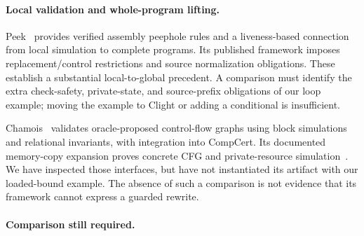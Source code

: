 \paragraph{Local validation and whole-program lifting.}
Peek~\cite{peek2016} provides verified assembly peephole rules and a
liveness-based connection from local simulation to complete programs. Its
published framework imposes replacement/control restrictions and source
normalization obligations. These establish a substantial local-to-global
precedent. A comparison must identify the extra check-safety, private-state,
and source-prefix obligations of our loop example; moving the example to
Clight or adding a conditional is insufficient.

Chamois~\cite{chamois2023} validates oracle-proposed control-flow graphs using
block simulations and relational invariants, with integration into CompCert.
Its documented memory-copy expansion proves concrete CFG and private-resource
simulation~\cite{chamoisapi}. We have inspected those interfaces, but have not
instantiated its artifact with our loaded-bound example. The absence of such a
comparison is not evidence that its framework cannot express a guarded rewrite.

\paragraph{Comparison still required.}
